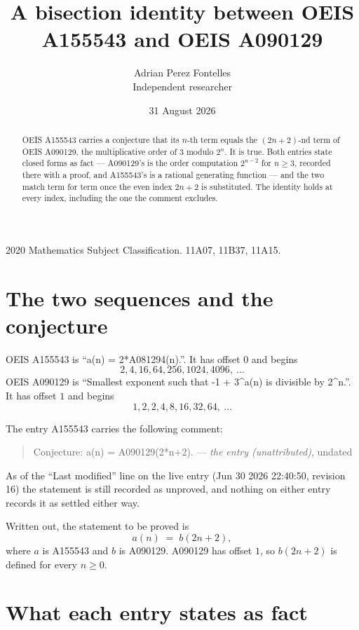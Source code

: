 \documentclass[11pt,a4paper]{article}
\title{A bisection identity between OEIS A155543 and OEIS A090129}
\author{Adrian Perez Fontelles\\ \small Independent researcher}
\date{31 August 2026}
\theoremstyle{plain}
\theoremstyle{definition}
\begin{document}
\maketitle

\begin{abstract}
OEIS A155543 carries a conjecture that its $n$-th term equals the $(2n+2)$-nd term of
OEIS A090129, the multiplicative order of $3$ modulo $2^{n}$. It is true. Both entries
state closed forms as fact --- A090129's is the order computation $2^{n-2}$ for
$n\ge3$, recorded there with a proof, and A155543's is a rational generating function ---
and the two match term for term once the even index $2n+2$ is substituted. The identity
holds at every index, including the one the comment excludes.
\end{abstract}

\noindent\small 2020 Mathematics Subject Classification. 11A07, 11B37, 11A15.\normalsize

\section{The two sequences and the conjecture}

OEIS A155543 is ``a(n) = 2*A081294(n).''. It has offset $0$ and begins
\[
2, 4, 16, 64, 256, 1024, 4096,\ \dots
\]
OEIS A090129 is ``Smallest exponent such that -1 + 3\^{}a(n) is divisible by 2\^{}n.''. It has offset $1$ and begins
\[
1, 2, 2, 4, 8, 16, 32, 64,\ \dots
\]

The entry A155543 carries the following comment:
\begin{quote}\small
Conjecture: a(n) = A090129(2*n+2). --- \emph{the entry (unattributed)}, undated
\end{quote}
As of the ``Last modified'' line on the live entry (Jun 30 2026 22:40:50, revision 16) the
statement is still recorded as unproved, and nothing on either entry records it as settled
either way.

Written out, the statement to be proved is
\begin{equation}\label{eq:conj}
a(n)\;=\;b(2n+2),
\end{equation}
where $a$ is A155543 and $b$ is A090129. A090129 has offset $1$, so $b(2n+2)$ is defined
for every $n\ge0$.

\section{What each entry states as fact}
\end{document}
